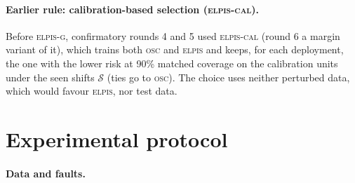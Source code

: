 \documentclass{esannV2}
\newcommand{\OSC}{\textsc{osc}}
\newcommand{\RPT}{\textsc{elpis}}
\newcommand{\AUTO}{\textsc{elpis-cal}}
\newcommand{\AUTOD}{\textsc{elpis-g}}
\begin{document}
\paragraph{Earlier rule: calibration-based selection (\AUTO).} Before \AUTOD, confirmatory rounds 4 and 5 used \AUTO{} (round 6 a margin variant of it), which trains both \OSC{} and \RPT{} and keeps, for each deployment, the one with the lower risk at 90\% matched coverage on the calibration units under the seen shifts $\mathcal S$ (ties go to \OSC). The choice uses neither perturbed data, which would favour \RPT, nor test data.

\FloatBarrier
\section{Experimental protocol}\label{sec:protocol}
\paragraph{Data and faults.}
\end{document}
